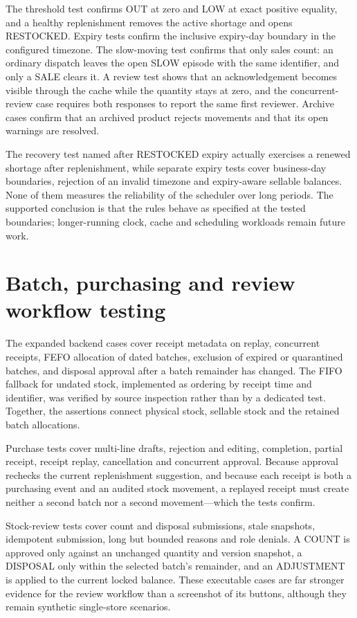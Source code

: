 The threshold test confirms OUT at zero and LOW at exact positive equality, and a healthy replenishment removes the active shortage and opens RESTOCKED. Expiry tests confirm the inclusive expiry-day boundary in the configured timezone. The slow-moving test confirms that only sales count: an ordinary dispatch leaves the open SLOW episode with the same identifier, and only a SALE clears it. A review test shows that an acknowledgement becomes visible through the cache while the quantity stays at zero, and the concurrent-review case requires both responses to report the same first reviewer. Archive cases confirm that an archived product rejects movements and that its open warnings are resolved.


The recovery test named after RESTOCKED expiry actually exercises a renewed shortage after replenishment, while separate expiry tests cover business-day boundaries, rejection of an invalid timezone and expiry-aware sellable balances. None of them measures the reliability of the scheduler over long periods. The supported conclusion is that the rules behave as specified at the tested boundaries; longer-running clock, cache and scheduling workloads remain future work.


\FloatBarrier

\section{Batch, purchasing and review workflow testing}

The expanded backend cases cover receipt metadata on replay, concurrent receipts, FEFO allocation of dated batches, exclusion of expired or quarantined batches, and disposal approval after a batch remainder has changed. The FIFO fallback for undated stock, implemented as ordering by receipt time and identifier, was verified by source inspection rather than by a dedicated test. Together, the assertions connect physical stock, sellable stock and the retained batch allocations.


Purchase tests cover multi-line drafts, rejection and editing, completion, partial receipt, receipt replay, cancellation and concurrent approval. Because approval rechecks the current replenishment suggestion, and because each receipt is both a purchasing event and an audited stock movement, a replayed receipt must create neither a second batch nor a second movement—which the tests confirm.


Stock-review tests cover count and disposal submissions, stale snapshots, idempotent submission, long but bounded reasons and role denials. A COUNT is approved only against an unchanged quantity and version snapshot, a DISPOSAL only within the selected batch's remainder, and an ADJUSTMENT is applied to the current locked balance. These executable cases are far stronger evidence for the review workflow than a screenshot of its buttons, although they remain synthetic single-store scenarios.


